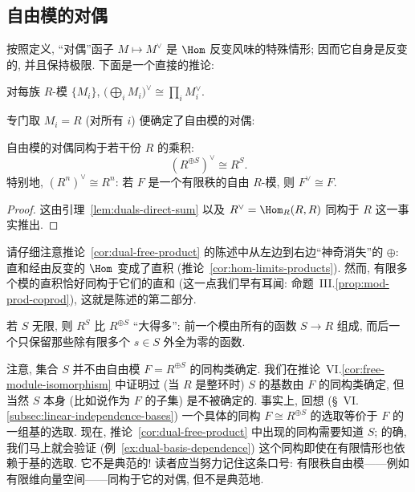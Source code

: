 \subsection{自由模的对偶}\label{subsec:duals-free-modules}

按照定义, ``对偶''函子 $M\mapsto M^\vee$ 是 $\Hom$ 反变风味的特殊情形; 因而它自身是反变的, 并且保持极限. 下面是一个直接的推论:

\begin{lemma}\label{lem:duals-direct-sum}
对每族 $R$-模 $\{M_i\}$, $\bigl(\bigoplus_i M_i\bigr)^\vee\cong\prod_i M_i^\vee$.
\end{lemma}

专门取 $M_i=R$ (对所有 $i$) 便确定了自由模的对偶:

\begin{corollary}\label{cor:dual-free-product}
自由模的对偶同构于若干份 $R$ 的乘积:
\[
(R^{\oplus S})^\vee\cong R^S.
\]
特别地, $(R^n)^\vee\cong R^n$: 若 $F$ 是一个有限秩的自由 $R$-模, 则 $F^\vee\cong F$.
\end{corollary}

\begin{proof}
这由引理~\ref{lem:duals-direct-sum} 以及 $R^\vee=\Hom_R(R,R)$ 同构于 $R$ 这一事实推出.
\end{proof}

请仔细注意推论~\ref{cor:dual-free-product} 的陈述中从左边到右边``神奇消失''的 $\oplus$: 直和经由反变的 $\Hom$ 变成了直积 (推论~\ref{cor:hom-limits-products}). 然而, 有限多个模的直积恰好同构于它们的直和 (这一点我们早有耳闻: 命题~III.\ref{prop:mod-prod-coprod}), 这就是陈述的第二部分.

\begin{remark}\label{rmk:dual-product-vs-sum}
若 $S$ 无限, 则 $R^S$ 比 $R^{\oplus S}$ ``大得多'': 前一个模由所有的函数 $S\to R$ 组成, 而后一个只保留那些除有限多个 $s\in S$ 外全为零的函数.
\end{remark}

\begin{remark}\label{rmk:basis-not-determined}
注意, 集合 $S$ 并不由自由模 $F=R^{\oplus S}$ 的同构类确定. 我们在推论~VI.\ref{cor:free-module-isomorphism} 中证明过 (当 $R$ 是整环时) $S$ 的基数由 $F$ 的同构类确定, 但当然 $S$ 本身 (比如说作为 $F$ 的子集) 是不被确定的. 事实上, 回想 (\S~VI.\ref{subsec:linear-independence-bases}) 一个具体的同构 $F\cong R^{\oplus S}$ 的选取等价于 $F$ 的一组基的选取. 现在, 推论~\ref{cor:dual-free-product} 中出现的同构需要知道 $S$; 的确, 我们马上就会验证 (例~\ref{ex:dual-basis-dependence}) 这个同构即使在有限情形也依赖于基的选取. 它不是典范的! 读者应当努力记住这条口号: 有限秩自由模——例如有限维向量空间——同构于它的对偶, 但不是典范地.
\end{remark}

